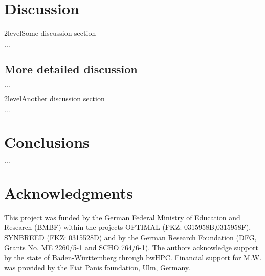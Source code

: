 \documentclass[12pt,titlepage]{article}
\begin{document}
\section*{Discussion}
\Genetics2level{Some discussion section}

$\dots$

\subsection{More detailed discussion}

$\dots$

\Genetics2level{Another discussion section}

$\dots$



\section*{Conclusions}

$\dots$




\section{Acknowledgments} 
This project was funded by the German Federal Ministry of Education and 
Research (BMBF) within the projects OPTIMAL (FKZ: 0315958B,0315958F),
SYNBREED (FKZ: 0315528D) and by the German Research Foundation 
(DFG, Grants No. ME 2260/5-1 and SCHO 764/6-1).
The authors acknowledge support by the state of Baden-W{\"u}rttemberg through 
bwHPC.
Financial support for M.W. was provided by the Fiat Panis foundation, Ulm,
Germany.



\nolinenumbers


\end{document}
